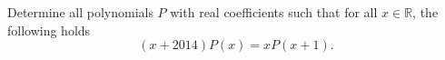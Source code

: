 Determine all polynomials $P$ with real coefficients such that for all $x \in\mathbb{R}$,
the following holds
$$(x+2014)P(x)=xP(x+1).$$